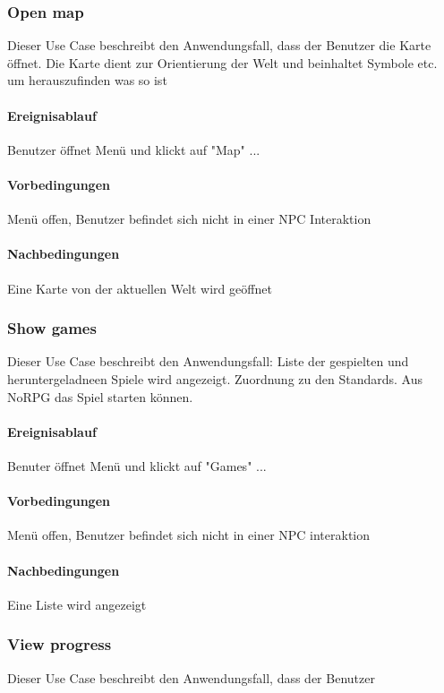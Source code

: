 		\subsubsection{Open map}
			Dieser Use Case beschreibt den Anwendungsfall, dass der Benutzer die Karte öffnet. Die Karte dient zur Orientierung der Welt und beinhaltet Symbole etc. um herauszufinden was so ist
			
			\paragraph{Ereignisablauf}
			Benutzer öffnet Menü und klickt auf "Map" ...
	
			\paragraph{Vorbedingungen}
				Menü offen, Benutzer befindet sich nicht in einer NPC Interaktion
			
			\paragraph{Nachbedingungen}
				Eine Karte von der aktuellen Welt wird geöffnet
	
		\subsubsection{Show games}
			Dieser Use Case beschreibt den Anwendungsfall: Liste der gespielten und heruntergeladneen Spiele wird angezeigt. Zuordnung zu den Standards. Aus NoRPG das Spiel starten können.
			
			\paragraph{Ereignisablauf}
				Benuter öffnet Menü und klickt auf "Games" ...

			\paragraph{Vorbedingungen}
				Menü offen, Benutzer befindet sich nicht in einer NPC interaktion
			
			\paragraph{Nachbedingungen}
				Eine Liste wird angezeigt
	
		\subsubsection{View progress}
			Dieser Use Case beschreibt den Anwendungsfall, dass der Benutzer 
			
